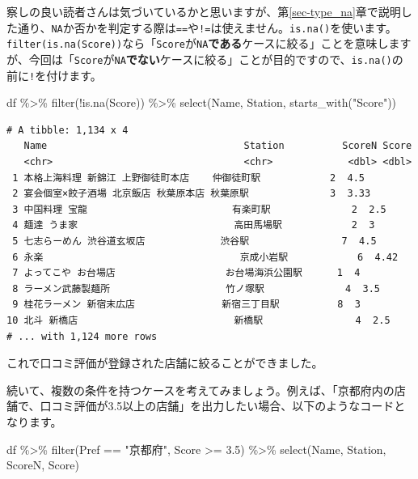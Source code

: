\documentclass[
  a4paper,
  pandoc,
  ja=standard,
  jafont=haranoaji]{bxjsbook}
\newenvironment{Shaded}{\begin{snugshade}}{\end{snugshade}}
\newcommand{\FloatTok}[1]{\textcolor[rgb]{0.68,0.00,0.00}{#1}}
\newcommand{\FunctionTok}[1]{\textcolor[rgb]{0.28,0.35,0.67}{#1}}
\newcommand{\NormalTok}[1]{\textcolor[rgb]{0.00,0.48,0.65}{#1}}
\newcommand{\SpecialCharTok}[1]{\textcolor[rgb]{0.37,0.37,0.37}{#1}}
\newcommand{\StringTok}[1]{\textcolor[rgb]{0.13,0.47,0.30}{#1}}
\begin{document}
察しの良い読者さんは気づいているかと思いますが、第\ref{sec-type_na}章で説明した通り、\texttt{NA}か否かを判定する際は\texttt{==}や\texttt{!=}は使えません。\texttt{is.na()}を使います。\texttt{filter(is.na(Score))}なら「\texttt{Score}が\texttt{NA}\textbf{である}ケースに絞る」ことを意味しますが、今回は「\texttt{Score}が\texttt{NA}\textbf{でない}ケースに絞る」ことが目的ですので、\texttt{is.na()}の前に\texttt{!}を付けます。

\begin{Shaded}
\begin{Highlighting}[numbers=left,,]
\NormalTok{df }\SpecialCharTok{\%\textgreater{}\%}
  \FunctionTok{filter}\NormalTok{(}\SpecialCharTok{!}\FunctionTok{is.na}\NormalTok{(Score)) }\SpecialCharTok{\%\textgreater{}\%}
  \FunctionTok{select}\NormalTok{(Name, Station, }\FunctionTok{starts\_with}\NormalTok{(}\StringTok{"Score"}\NormalTok{))}
\end{Highlighting}
\end{Shaded}

\begin{verbatim}
# A tibble: 1,134 x 4
   Name                                  Station          ScoreN Score
   <chr>                                 <chr>             <dbl> <dbl>
 1 本格上海料理 新錦江 上野御徒町本店    仲御徒町駅            2  4.5 
 2 宴会個室×餃子酒場 北京飯店 秋葉原本店 秋葉原駅              3  3.33
 3 中国料理 宝龍                         有楽町駅              2  2.5 
 4 麺達 うま家                           高田馬場駅            2  3   
 5 七志らーめん 渋谷道玄坂店             渋谷駅                7  4.5 
 6 永楽                                  京成小岩駅            6  4.42
 7 よってこや お台場店                   お台場海浜公園駅      1  4   
 8 ラーメン武藤製麺所                    竹ノ塚駅              4  3.5 
 9 桂花ラーメン 新宿末広店               新宿三丁目駅          8  3   
10 北斗 新橋店                           新橋駅                4  2.5 
# ... with 1,124 more rows
\end{verbatim}

これで口コミ評価が登録された店舗に絞ることができました。

続いて、複数の条件を持つケースを考えてみましょう。例えば、「京都府内の店舗で、口コミ評価が3.5以上の店舗」を出力したい場合、以下のようなコードとなります。

\begin{Shaded}
\begin{Highlighting}[numbers=left,,]
\NormalTok{df }\SpecialCharTok{\%\textgreater{}\%}
  \FunctionTok{filter}\NormalTok{(Pref }\SpecialCharTok{==} \StringTok{"京都府"}\NormalTok{, Score }\SpecialCharTok{\textgreater{}=} \FloatTok{3.5}\NormalTok{) }\SpecialCharTok{\%\textgreater{}\%}
  \FunctionTok{select}\NormalTok{(Name, Station, ScoreN, Score)}
\end{Highlighting}
\end{Shaded}
\end{document}
